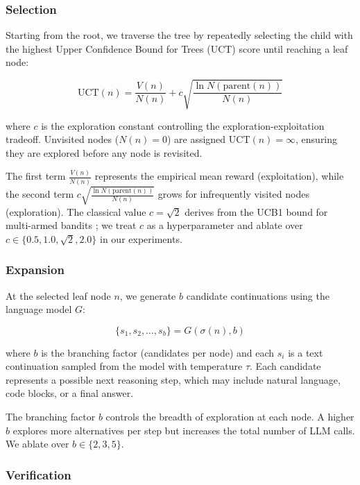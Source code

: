 \documentclass[11pt,a4paper]{article}
\begin{document}
\subsubsection{Selection}

Starting from the root, we traverse the tree by repeatedly selecting the child
with the highest Upper Confidence Bound for Trees (UCT) score until reaching a
leaf node:

\begin{equation}
\text{UCT}(n) = \frac{V(n)}{N(n)} + c \sqrt{\frac{\ln N(\text{parent}(n))}{N(n)}}
\label{eq:uct}
\end{equation}

\noindent where $c$ is the exploration constant controlling the
exploration-exploitation tradeoff. Unvisited nodes ($N(n) = 0$) are assigned
$\text{UCT}(n) = \infty$, ensuring they are explored before any node is
revisited.

The first term $\frac{V(n)}{N(n)}$ represents the empirical mean reward
(exploitation), while the second term $c\sqrt{\frac{\ln N(\text{parent}(n))}
{N(n)}}$ grows for infrequently visited nodes (exploration). The classical
value $c = \sqrt{2}$ derives from the UCB1 bound for multi-armed bandits
\citep{auer2002finitetime}; we treat $c$ as a hyperparameter and ablate over
$c \in \{0.5, 1.0, \sqrt{2}, 2.0\}$ in our experiments.

\subsubsection{Expansion}

At the selected leaf node $n$, we generate $b$ candidate continuations using
the language model $G$:

\begin{equation}
\{s_1, s_2, \ldots, s_b\} = G(\sigma(n), b)
\end{equation}

\noindent where $b$ is the branching factor (candidates per node) and each
$s_i$ is a text continuation sampled from the model with temperature $\tau$.
Each candidate represents a possible next reasoning step, which may include
natural language, code blocks, or a final answer.

The branching factor $b$ controls the breadth of exploration at each node. A
higher $b$ explores more alternatives per step but increases the total number of
LLM calls. We ablate over $b \in \{2, 3, 5\}$.

\subsubsection{Verification}
\label{sec:verification}
\end{document}
